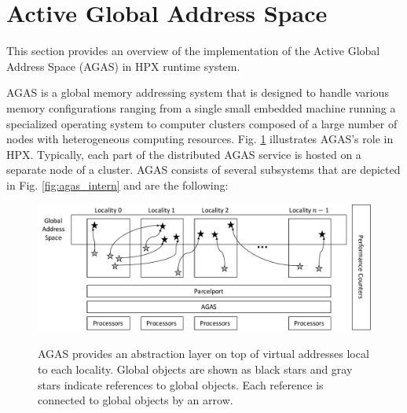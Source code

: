 \section{Active Global Address Space}
\label{agas}

This section provides an overview of the implementation of the Active Global
Address Space (AGAS) in HPX runtime system.

AGAS is a global memory addressing system that is designed to
handle various memory configurations ranging from a single small embedded
machine running a specialized operating system to computer clusters composed of
a large number of nodes with heterogeneous computing resources. Fig.
\ref{fig:agas_struct} illustrates AGAS's role in HPX. Typically, 
each part of the distributed AGAS service is hosted on a separate node of a
cluster. AGAS consists of several subsystems that are depicted in Fig.
\ref{fig:agas_intern} and are the following:

\begin{figure}[h]
    \centering
    \vspace{2.5cm}
    \caption{AGAS provides an abstraction layer on top of virtual addresses local to each locality. Global objects are shown as black stars and gray stars indicate references to global objects. Each reference is connected to global objects by an arrow.}
    \includegraphics[width=.97\textwidth,height=\textheight,keepaspectratio]{illustrations/agas_struct}
    \label{fig:agas_struct}
\end{figure}


